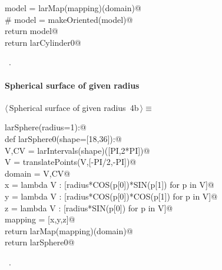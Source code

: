 \documentclass[11pt,oneside]{article}	%
\begin{document}
\begin{flushleft}
\begin{list}{}{}
\mbox{}\verb@      model = larMap(mapping)(domain)@\\
\mbox{}\verb@      # model = makeOriented(model)@\\
\mbox{}\verb@      return model@\\
\mbox{}\verb@   return larCylinder0@\\
\mbox{}\verb@@{\NWsep}
\end{list}
\vspace{-1ex}
\footnotesize\addtolength{\baselineskip}{-1ex}
\begin{list}{}{\setlength{\itemsep}{-\parsep}\setlength{\itemindent}{-\leftmargin}}
\item \NWtxtMacroRefIn\ .
\end{list}
\end{flushleft}
\paragraph{Spherical surface of given radius}
\begin{flushleft} \small \label{scrap9}
\protect{}$\langle\,$Spherical surface of given radius\nobreak\ {\footnotesize 4b}$\,\rangle\equiv$
\vspace{-1ex}
\begin{list}{}{} \item
\mbox{}\verb@def larSphere(radius=1):@\\
\mbox{}\verb@   def larSphere0(shape=[18,36]):@\\
\mbox{}\verb@      V,CV = larIntervals(shape)([PI,2*PI])@\\
\mbox{}\verb@      V = translatePoints(V,[-PI/2,-PI])@\\
\mbox{}\verb@      domain = V,CV@\\
\mbox{}\verb@      x = lambda V : [radius*COS(p[0])*SIN(p[1]) for p in V]@\\
\mbox{}\verb@      y = lambda V : [radius*COS(p[0])*COS(p[1]) for p in V]@\\
\mbox{}\verb@      z = lambda V : [radius*SIN(p[0]) for p in V]@\\
\mbox{}\verb@      mapping = [x,y,z]@\\
\mbox{}\verb@      return larMap(mapping)(domain)@\\
\mbox{}\verb@   return larSphere0@\\
\mbox{}\verb@@{\NWsep}
\end{list}
\vspace{-1ex}
\footnotesize\addtolength{\baselineskip}{-1ex}
\begin{list}{}{\setlength{\itemsep}{-\parsep}\setlength{\itemindent}{-\leftmargin}}
\item \NWtxtMacroRefIn\ .
\end{list}
\end{flushleft}
\end{document}
